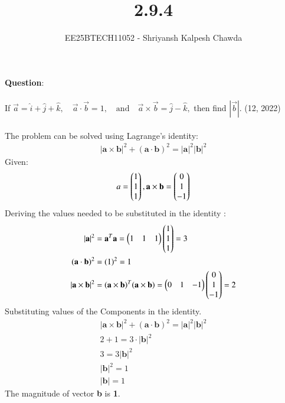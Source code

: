 \documentclass[journal]{IEEEtran}
\begin{document}
	
	
	\vspace{3cm}
	
	\title{2.9.4}
	\author{EE25BTECH11052 - Shriyansh Kalpesh Chawda}


	{\let\newpage\relax\maketitle}
	
	\renewcommand{\thefigure}{\theenumi}
	\renewcommand{\thetable}{\theenumi}
	\setlength{\intextsep}{10pt} 
	
	\renewcommand{\thetable}{\theenumi}
	\textbf{Question}:\\
	\\
	If  $\vec{a} = \hat{i} + \hat{j} + \hat{k}, \quad \vec{a} \cdot \vec{b} = 1, \quad \text{and} \quad \vec{a} \times \vec{b} = \hat{j} - \hat{k},$ then find $|\vec{b}|$.
	\hfill (12, 2022)
	\\
	\solution\\
	The problem can be solved using Lagrange's identity:
	\begin{align}
|\mathbf{a} \times \mathbf{b}|^2 + (\mathbf{a} \cdot \mathbf{b})^2 = |\mathbf{a}|^2 |\mathbf{b}|^2 
\end{align}
	Given:
	\[
	a=\begin{pmatrix}1\\1\\1\end{pmatrix} ,
	\mathbf{a} \times \mathbf{b} = \begin{pmatrix}0 \\ 1 \\ -1\end{pmatrix}
	\]
Deriving the values needed to be substituted in the identity :
\begin{align}
|\mathbf{a}|^2 &= \mathbf{a}^T \mathbf{a} = \begin{pmatrix}1 & 1 & 1\end{pmatrix}\begin{pmatrix}1\\1\\1\end{pmatrix} = 3 \\ 
(\mathbf{a} \cdot \mathbf{b})^2 &= (1)^2 = 1 \\
|\mathbf{a} \times \mathbf{b}|^2 &= (\mathbf{a} \times \mathbf{b})^T (\mathbf{a} \times \mathbf{b}) = \begin{pmatrix}0 & 1 & -1\end{pmatrix}\begin{pmatrix}0\\1\\-1\end{pmatrix} = 2
		\end{align}
	Substituting values of the Components in the identity.
	\begin{align}
		|\mathbf{a} \times \mathbf{b}|^2 + (\mathbf{a} \cdot \mathbf{b})^2 = |\mathbf{a}|^2 |\mathbf{b}|^2 \\
		2 + 1 = 3 \cdot |\mathbf{b}|^2 \\
		3 = 3 |\mathbf{b}|^2 \\
		|\mathbf{b}|^2 = 1 \\
		|\mathbf{b}| = 1
	\end{align}
	The magnitude of vector \textbf{b} is \textbf{1}.	
	
\end{document}
